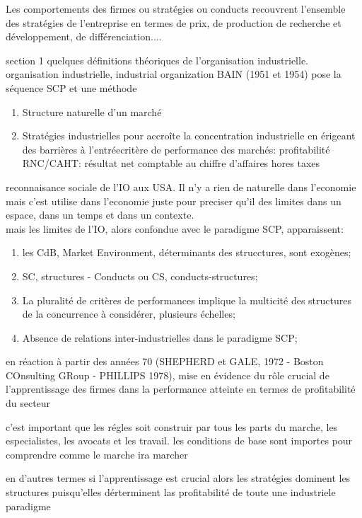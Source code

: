 \documentclass{article}
\begin{document}

Les comportements des firmes ou stratégies ou conducts recouvrent l'ensemble des stratégies de l'entreprise en termes de prix, de production de recherche et développement, de différenciation....

section 1 quelques définitions théoriques de l'organisation industrielle. organisation industrielle, industrial organization BAIN (1951 et 1954) pose la séquence SCP et une méthode
\begin{enumerate}
    \item Structure naturelle d'un marché
    \item Stratégies industrielles pour accroîte la concentration industrielle en érigeant des barrières à l'entréecritère de performance des marchés: profitabilité
    RNC/CAHT: résultat net comptable au chiffre d'affaires hores taxes
\end{enumerate}
reconnaisance sociale de l'IO aux USA. Il n'y a rien de naturelle dans l'economie mais c'est utilise dans l'economie juste pour preciser qu'il des limites dans un espace, dans un temps et dans un contexte.\\

mais les limites de l'IO, alors confondue avec le paradigme SCP, apparaissent:
\begin{enumerate}
    \item les CdB, Market Environment, déterminants des strucctures, sont exogènes;
    \item SC, structures - Conducts ou CS, conducts-structures;
    \item La pluralité de critères de performances implique la multicité des structures de la concurrence à considérer, plusieurs échelles;
    \item Absence de relations inter-industrielles dans le paradigme SCP;
\end{enumerate}

en réaction à partir des années 70 (SHEPHERD et GALE, 1972 - Boston COnsulting GRoup - PHILLIPS 1978), mise en évidence du rôle crucial de l'apprentissage des firmes dans la performance atteinte en termes de profitabilité du secteur

c'est important que les régles soit construir par tous les parts du marche, les especialistes, les avocats et les travail. les conditions de base sont importes pour comprendre comme le marche ira marcher

en d'autres termes si l'apprentissage est crucial alors les stratégies dominent les structures puisqu'elles dérterminent las profitabilité de toute une industriele paradigme
\end{document}
